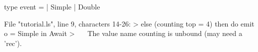 \runverbatimfalse
{}
\begin{RunVerbatimMsg}
type event   =  | Simple  | Double
\end{RunVerbatimMsg}
\begin{RunVerbatimErr}
File "tutorial.ls", line 9, characters 14-26:
>        else (counting top = 4) then do emit o = Simple in Await
>              ^^^^^^^^^^^^
The value name counting is unbound (may need a 'rec').
\end{RunVerbatimErr}
